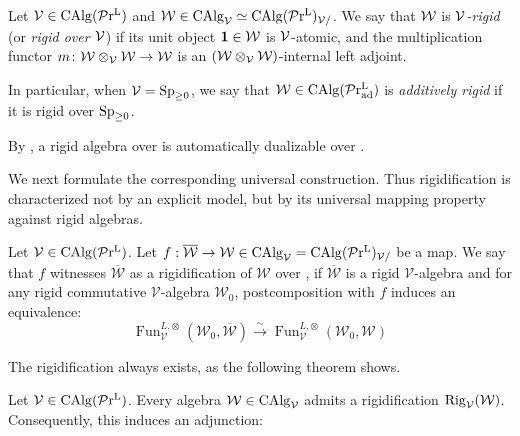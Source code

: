 \documentclass[a4paper,10pt, oneside]{amsart}
\begin{document}
\begin{de}
	Let $\mathcal{V}\in\operatorname{CAlg}(\mathcal{P}\mathrm{r}^\mathrm{L})$ and $\mathcal{W}\in\operatorname{CAlg}_{\mathcal{V}}\simeq\operatorname{CAlg}(\mathcal{P}\mathrm{r}^\mathrm{L})_{\mathcal{V}/}$. We say that $\mathcal{W}$ is \emph{$\mathcal{V}$-rigid} (or \emph{rigid over $\mathcal{V}$}) if its unit object $\mathbf{1}\in \mathcal{W}$ is $\mathcal{V}$-atomic, and the multiplication functor $m \colon \mathcal{W} \otimes_{\mathcal{V}} \mathcal{W} \to \mathcal{W}$ is an $(\mathcal{W} \otimes_{\mathcal{V}} \mathcal{W})$-internal left adjoint. 
	
	In particular, when $\mathcal{V}=\operatorname{Sp}_{\geq0}$, we say that $\mathcal{W}\in\operatorname{CAlg}(\mathcal{P}\mathrm{r}_{\mathrm{ad}}^\mathrm{L})$ is \emph{additively rigid} if it is rigid over $\operatorname{Sp}_{\geq0}$.
\end{de}
	\begin{rem}
		By \cite[Lemma 4.57]{ramzi2024locally}, a  rigid algebra \mcw over \mcv is automatically dualizable over \mcv.
	\end{rem}
	We next formulate the corresponding universal construction. Thus rigidification is characterized not by an explicit model, but by its universal mapping property against rigid algebras.
	\begin{de}
	Let $\mathcal{V}\in\operatorname{CAlg}(\mathcal{P}\mathrm{r}^\mathrm{L})$. Let $f: \overline{\mathcal{W}} \rightarrow \mathcal{W} \in \operatorname{CAlg}_{\mathcal{V}}=\operatorname{CAlg}(\mathcal{P}\mathrm{r}^\mathrm{L})_{\mathcal{V}/}$ be a map. We say that $f$ witnesses $\overline{\mathcal{W}}$ as a rigidification of $\mathcal{W}$ over \mcv, if $\overline{\mathcal{W}}$ is a rigid $\mathcal{V}$-algebra and for any rigid commutative $\mathcal{V}$-algebra $\mathcal{W}_0$, postcomposition with $f$ induces an equivalence:
		$$
		\operatorname{Fun}_{\mathcal{V}}^{L, \otimes}\left(\mathcal{W}_0, \overline{\mathcal{W}}\right) \xrightarrow{\sim} \operatorname{Fun}_{\mathcal{V}}^{L, \otimes}\left(\mathcal{W}_0, \mathcal{W}\right)
		$$
	\end{de}
	The rigidification always exists, as the following theorem shows.
\begin{thm}
	Let $\mathcal{V} \in \operatorname{CAlg}(\mathcal{P}\mathrm{r}^\mathrm{L})$. Every algebra $\mathcal{W} \in \operatorname{CAlg}_{\mathcal{V}}$ admits a rigidification $\mathrm{Rig}_{\mathcal{V}}(\mathcal{W})$. Consequently, this induces an adjunction:
\end{thm}
\end{document}
